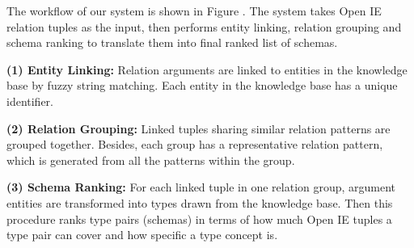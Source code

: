 The workflow of our system is shown in Figure .
The system takes Open IE relation tuples as the input,
then performs entity linking, relation grouping and schema ranking
to translate them into final ranked list of schemas.

{\bf(1) Entity Linking:}
Relation arguments are linked to entities in the knowledge base by
fuzzy string matching. Each entity in the knowledge base has a unique identifier.

{\bf(2) Relation Grouping:}
Linked tuples sharing similar relation patterns are grouped together.
Besides, each group has a representative relation pattern, which is generated from all the patterns within the group.

{\bf(3) Schema Ranking:}
For each linked tuple in one relation group, argument entities are transformed into types drawn from the knowledge base.
Then this procedure ranks type pairs (schemas) in terms of how much Open IE tuples a type pair can cover and how specific a type concept is.






